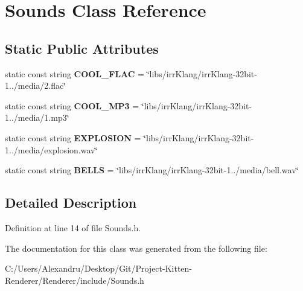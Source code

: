 \hypertarget{class_sounds}{}\section{Sounds Class Reference}
\label{class_sounds}
\subsection*{Static Public Attributes}
\begin{DoxyCompactItemize}
\item 
\hypertarget{class_sounds_a3ce543d80957e9130ea03c211aaf99bd}{}static const string {\bfseries C\+O\+O\+L\+\_\+\+F\+L\+A\+C} = \char`\"{}libs/irr\+Klang/irr\+Klang-\/32bit-\/1../media/2.\+flac\char`\"{}\label{class_sounds_a3ce543d80957e9130ea03c211aaf99bd}

\item 
\hypertarget{class_sounds_af8e76687423071b67793d9fbc4b3c5b3}{}static const string {\bfseries C\+O\+O\+L\+\_\+\+M\+P3} = \char`\"{}libs/irr\+Klang/irr\+Klang-\/32bit-\/1../media/1.\+mp3\char`\"{}\label{class_sounds_af8e76687423071b67793d9fbc4b3c5b3}

\item 
\hypertarget{class_sounds_a83652946e9f03070e09c56ced31e2ce5}{}static const string {\bfseries E\+X\+P\+L\+O\+S\+I\+O\+N} = \char`\"{}libs/irr\+Klang/irr\+Klang-\/32bit-\/1../media/explosion.\+wav\char`\"{}\label{class_sounds_a83652946e9f03070e09c56ced31e2ce5}

\item 
\hypertarget{class_sounds_a2889bca7456add6685f9d4606b7eb3c6}{}static const string {\bfseries B\+E\+L\+L\+S} = \char`\"{}libs/irr\+Klang/irr\+Klang-\/32bit-\/1../media/bell.\+wav\char`\"{}\label{class_sounds_a2889bca7456add6685f9d4606b7eb3c6}

\end{DoxyCompactItemize}


\subsection{Detailed Description}


Definition at line 14 of file Sounds.\+h.



The documentation for this class was generated from the following file\+:\begin{DoxyCompactItemize}
\item 
C\+:/\+Users/\+Alexandru/\+Desktop/\+Git/\+Project-\/\+Kitten-\/\+Renderer/\+Renderer/include/Sounds.\+h\end{DoxyCompactItemize}
